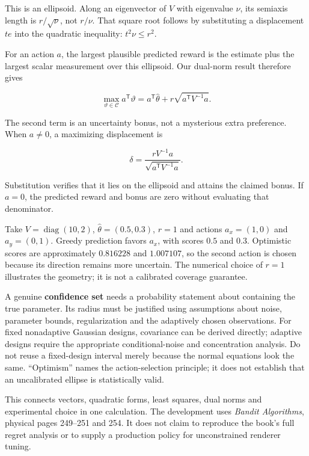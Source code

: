 This is an ellipsoid. Along an eigenvector of \(V\) with eigenvalue \(\nu\), its semiaxis length is \(r/\sqrt\nu\), not \(r/\nu\). That square root follows by substituting a displacement \(te\) into the quadratic inequality: \(t^2\nu\le r^2\).

For an action \(a\), the largest plausible predicted reward is the estimate plus the largest scalar measurement over this ellipsoid. Our dual-norm result therefore gives

\[
\max_{\vartheta\in\mathcal C}a^{\mathsf T}\vartheta
=a^{\mathsf T}\widehat\theta
+r\sqrt{a^{\mathsf T}V^{-1}a}.
\]

The second term is an uncertainty bonus, not a mysterious extra preference. When \(a\ne0\), a maximizing displacement is

\[
\delta=\frac{rV^{-1}a}{\sqrt{a^{\mathsf T}V^{-1}a}}.
\]

Substitution verifies that it lies on the ellipsoid and attains the claimed bonus. If \(a=0\), the predicted reward and bonus are zero without evaluating that denominator.

Take \(V=\operatorname{diag}(10,2)\), \(\widehat\theta=(0.5,0.3)\), \(r=1\) and actions \(a_x=(1,0)\) and \(a_y=(0,1)\). Greedy prediction favors \(a_x\), with scores \(0.5\) and \(0.3\). Optimistic scores are approximately \(0.816228\) and \(1.007107\), so the second action is chosen because its direction remains more uncertain. The numerical choice of \(r=1\) illustrates the geometry; it is not a calibrated coverage guarantee.

A genuine \textbf{confidence set} needs a probability statement about containing the true parameter. Its radius must be justified using assumptions about noise, parameter bounds, regularization and the adaptively chosen observations. For fixed nonadaptive Gaussian designs, covariance can be derived directly; adaptive designs require the appropriate conditional-noise and concentration analysis. Do not reuse a fixed-design interval merely because the normal equations look the same. ``Optimism'' names the action-selection principle; it does not establish that an uncalibrated ellipse is statistically valid.

This connects vectors, quadratic forms, least squares, dual norms and experimental choice in one calculation. The development uses \emph{Bandit Algorithms}, physical pages 249--251 and 254. It does not claim to reproduce the book's full regret analysis or to supply a production policy for unconstrained renderer tuning.


